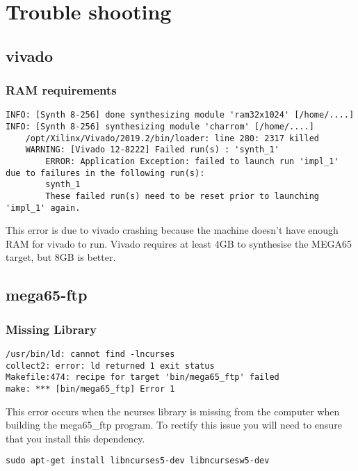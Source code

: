 \chapter{Trouble shooting}
    \section{vivado}
    \subsection{RAM requirements}
    \begin{tcolorbox}[colback=black,coltext=white]
    \verbatimfont{\codefont}
    \begin{verbatim}
INFO: [Synth 8-256] done synthesizing module 'ram32x1024' [/home/....]
INFO: [Synth 8-256] synthesizing module 'charrom' [/home/....]
    /opt/Xilinx/Vivado/2019.2/bin/loader: line 280: 2317 killed
    WARNING: [Vivado 12-8222] Failed run(s) : 'synth_1'
        ERROR: Application Exception: failed to launch run 'impl_1' due to failures in the following run(s):
        synth_1
        These failed run(s) need to be reset prior to launching 'impl_1' again.
    \end{verbatim}
    \end{tcolorbox}
This error is due to vivado crashing because the machine doesn't have enough RAM for vivado to run.
Vivado requires at least 4GB to synthesise the MEGA65 target, but 8GB is better.

\section{mega65-ftp}
    \subsection{Missing Library}
    \begin{tcolorbox}[colback=black,coltext=white]
    \verbatimfont{\codefont}
    \begin{verbatim}
/usr/bin/ld: cannot find -lncurses
collect2: error: ld returned 1 exit status
Makefile:474: recipe for target 'bin/mega65_ftp' failed
make: *** [bin/mega65_ftp] Error 1
    \end{verbatim}
    \end{tcolorbox}
This error occurs when the ncurses library is missing from the computer when building the mega65_ftp program.
To rectify this issue you will need to ensure that you install this dependency.

    \begin{tcolorbox}[colback=black,coltext=white]
    \verbatimfont{\codefont}
    \begin{verbatim}
sudo apt-get install libncurses5-dev libncursesw5-dev
    \end{verbatim}
    \end{tcolorbox}
